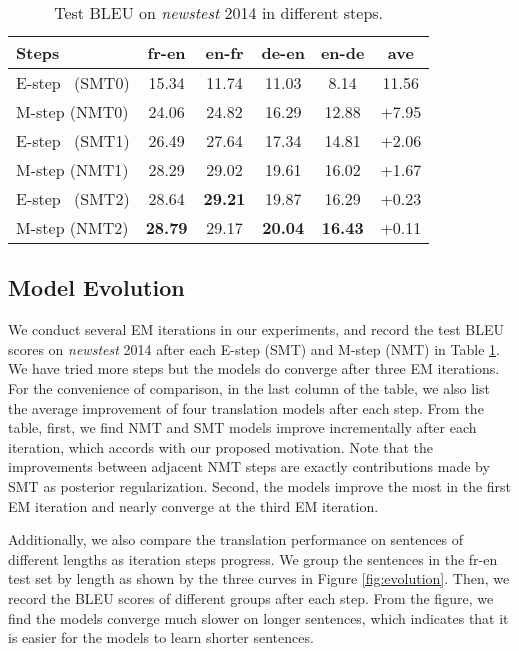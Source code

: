 \documentclass[letterpaper]{article} \usepackage{aaai19}  \usepackage{times}  \usepackage{helvet}  \usepackage{courier}  \usepackage{url}  \usepackage{graphicx}  \usepackage{amsmath}
\begin{document}
\begin{table}[t!]
\small
\begin{center}
\begin{tabular}{l|cccc|c}
\hline
Steps & fr-en & en-fr & de-en & en-de & ave \\
\hline
\hline
E-step \ (SMT0) & 15.34 & 11.74 & 11.03 & 8.14 & 11.56\\
M-step (NMT0) & 24.06 & 24.82 & 16.29 & 12.88 & +7.95\\
\hline
E-step \ (SMT1) & 26.49 & 27.64 & 17.34 & 14.81 & +2.06\\
M-step (NMT1) & 28.29 & 29.02 & 19.61 & 16.02 & +1.67\\
\hline
E-step \ (SMT2) & 28.64 & \textbf{29.21} & 19.87 & 16.29 & +0.23\\
M-step (NMT2) & \textbf{28.79} & 29.17 & \textbf{20.04} & \textbf{16.43} & +0.11\\
\hline
\end{tabular}
\end{center}
\caption{\label{tab:evolution} Test BLEU on \emph{newstest} 2014 in different steps.}
\end{table}

\subsection{Model Evolution}
\label{evolution}
We conduct several EM iterations in our experiments, and record the test BLEU scores on \emph{newstest} 2014 after each E-step (SMT) and M-step (NMT) in Table \ref{tab:evolution}. We have tried more steps but the models do converge after three EM iterations. For the convenience of comparison, in the last column of the table, we also list the average improvement of four translation models after each step. From the table, first, we find NMT and SMT models improve incrementally after each iteration, which accords with our proposed motivation. Note that the improvements between adjacent NMT steps are exactly contributions made by SMT as posterior regularization. 
Second, the models improve the most in the first EM iteration and nearly converge at the third EM iteration. 

Additionally, we also compare the translation performance on sentences of different lengths as iteration steps progress. We group the sentences in the fr-en test set by length as shown by the three curves in Figure \ref{fig:evolution}. Then, we record the BLEU scores of different groups after each step. From the figure, we find the models converge much slower on longer sentences, which indicates that it is easier for the models to learn shorter sentences. 
\end{document}
